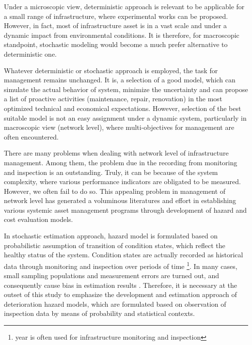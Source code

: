 Under a microscopic view, deterministic approach is relevant to be applicable for a small range of infrastructure, where experimental works can be proposed. However, in fact, most of infrastructure asset is in a vast scale and under a dynamic impact from environmental conditions. It is therefore, for macroscopic standpoint, stochastic modeling would become a much prefer alternative to deterministic one.

Whatever deterministic or stochastic approach is employed, the task for management remains unchanged. It is, a selection of a good model, which can simulate the actual behavior of system, minimize the uncertainty and can propose a list of proactive activities (maintenance, repair, renovation) in the most optimized technical and economical expectations. However, selection of the best suitable model is not an easy assignment under a dynamic system, particularly in macroscopic view (network level), where multi-objectives for management are often encountered.

%
There are many problems when dealing with network level of infrastructure management. Among them, the problem due in the recording from monitoring and inspection is an outstanding. Truly, it can be because of the system complexity, where various performance indicators are obligated to be measured. However, we often fail to do so. 
This appealing problem in management of network level has generated a voluminous literatures and effort in establishing various systemic asset management programs through development of hazard and cost evaluation models.

In stochastic estimation approach, hazard model is formulated based on probabilistic assumption of transition of condition states, which reflect the healthy status of the system. Condition states are actually recorded as historical data through monitoring and inspection over periods of time \footnote{year is often used for infrastructure monitoring and inspection}. In many cases, small sampling populations and measurement errors are turned out, and consequently cause bias in estimation results \cite{kobahidden}. Therefore, it is necessary at the outset of this study to emphasize the development and estimation approach of deterioration hazard models, which are formulated based on observation of inspection data by means of probability and statistical contexts.

